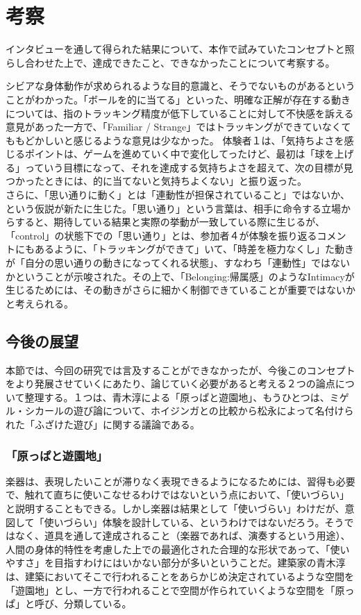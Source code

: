 \chapter{考察}
インタビューを通して得られた結果について、本作で試みていたコンセプトと照らし合わせた上で、達成できたこと、できなかったことについて考察する。

シビアな身体動作が求められるような目的意識と、そうでないものがあるということがわかった。「ボールを的に当てる」といった、明確な正解が存在する動きについては、指のトラッキング精度が低下していることに対して不快感を訴える意見があった一方で、「Familiar / Strange」ではトラッキングができていなくてももどかしいと感じるような意見は少なかった。
体験者１は、「気持ちよさを感じるポイントは、ゲームを進めていく中で変化してったけど、最初は「球を上げる」っていう目標になって、それを達成する気持ちよさを超えて、次の目標が見つかったときには、的に当てないと気持ちよくない」と振り返った。\\

さらに、「思い通りに動く」とは「連動性が担保されていること」ではないか、という仮説が新たに生じた。「思い通り」という言葉は、相手に命令する立場からすると、期待している結果と実際の挙動が一致している際に生じるが、「control」の状態下での「思い通り」とは、参加者４が体験を振り返るコメントにもあるように、「トラッキングができて」いて、「時差を極力なくし」た動きが「自分の思い通りの動きになってくれる状態」、すなわち「連動性」ではないかということが示唆された。その上で、「Belonging:帰属感」のようなIntimacyが生じるためには、その動きがさらに細かく制御できていることが重要ではないかと考えられる。

\section{今後の展望}
本節では、今回の研究では言及することができなかったが、今後このコンセプトをより発展させていくにあたり、論じていく必要があると考える２つの論点について整理する。１つは、青木淳による「原っぱと遊園地」、もうひとつは、ミゲル・シカールの遊び論について、ホイジンガとの比較から松永によって名付けられた「ふざけた遊び」に関する議論である。

\subsection{「原っぱと遊園地」}
楽器は、表現したいことが滞りなく表現できるようになるためには、習得も必要で、触れて直ちに使いこなせるわけではないという点において、「使いづらい」と説明することもできる。しかし楽器は結果として「使いづらい」わけだが、意図して「使いづらい」体験を設計している、というわけではないだろう。そうではなく、道具を通して達成されること（楽器であれば、演奏するという用途）、人間の身体的特性を考慮した上での最適化された合理的な形状であって、「使いやすさ」を目指すわけにはいかない部分が多いということだ。建築家の青木淳は、建築においてそこで行われることをあらかじめ決定されているような空間を「遊園地」とし、一方で行われることで空間が作られていくような空間を「原っぱ」と呼び、分類している。

